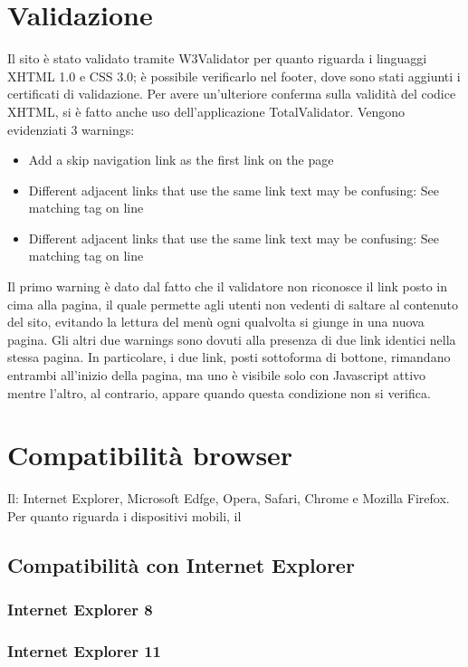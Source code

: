 \documentclass[10pt, a4paper]{article}
\begin{document}
\section{Validazione}
Il sito è stato validato tramite W3Validator per quanto riguarda i linguaggi XHTML 1.0 e CSS 3.0; è possibile verificarlo nel footer, dove sono stati aggiunti i certificati di validazione. Per avere un’ulteriore conferma sulla validità del codice XHTML, si è fatto anche uso dell’applicazione TotalValidator. Vengono evidenziati 3 warnings:
\begin{itemize}
\item{Add a skip navigation link as the first link on the page}
\item{Different adjacent links that use the same link text may be confusing: See matching tag on line}
\item{Different adjacent links that use the same link text may be confusing: See matching tag on line}
\end{itemize}
Il primo warning è dato dal fatto che il validatore non riconosce il link posto in cima alla pagina, il quale permette agli utenti non vedenti di saltare al contenuto del sito, evitando la lettura del menù ogni qualvolta si giunge in una nuova pagina. 
Gli altri due warnings sono dovuti alla presenza di due link identici nella stessa pagina. In particolare, i due link, posti sottoforma di bottone, rimandano entrambi all'inizio della pagina, ma uno è visibile solo con Javascript attivo mentre l'altro, al contrario, appare quando questa condizione non si verifica. 


\section{Compatibilità browser}
Il: Internet Explorer, Microsoft Edfge, Opera, Safari, Chrome e Mozilla Firefox.%
Per quanto riguarda i dispositivi mobili, il%
\subsection{Compatibilità con Internet Explorer}

\subsubsection{Internet Explorer 8}

\subsubsection{Internet Explorer 11}
\end{document}
